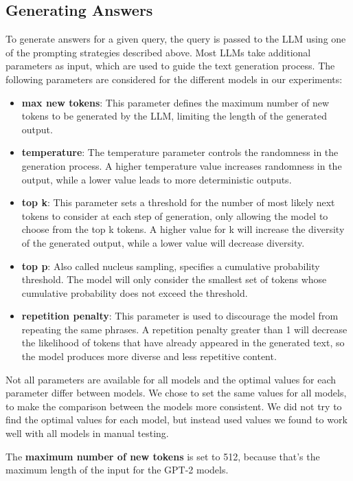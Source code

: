 \subsection{Generating Answers}
To generate answers for a given query, the query is passed to the LLM using one of the prompting strategies described above.
Most LLMs take additional parameters as input, which are used to guide the text generation process.
The following parameters are considered for the different models in our experiments:
\begin{itemize}
    \item \textbf{max new tokens}: This parameter defines the maximum number of new tokens to be generated by the LLM, limiting the length of the generated output.
    \item \textbf{temperature}: The temperature parameter controls the randomness in the generation process. A higher temperature value increases randomness in the output, while a lower value leads to more deterministic outputs.
    \item \textbf{top k}: This parameter sets a threshold for the number of most likely next tokens to consider at each step of generation, only allowing the model to choose from the top k tokens. A higher value for k will increase the diversity of the generated output, while a lower value will decrease diversity.
    \item \textbf{top p}:  Also called nucleus sampling, specifies a cumulative probability threshold. The model will only consider the smallest set of tokens whose cumulative probability does not exceed the threshold.
    \item \textbf{repetition penalty}: This parameter is used to discourage the model from repeating the same phrases. A repetition penalty greater than 1 will decrease the likelihood of tokens that have already appeared in the generated text, so the model produces more diverse and less repetitive content.
\end{itemize}
Not all parameters are available for all models and the optimal values for each parameter differ between models.
We chose to set the same values for all models, to make the comparison between the models more consistent.
We did not try to find the optimal values for each model, but instead used values we found to work well with all models in manual testing.

The \textbf{maximum number of new tokens} is set to 512, because that's the maximum length of the input for the GPT-2 models.

